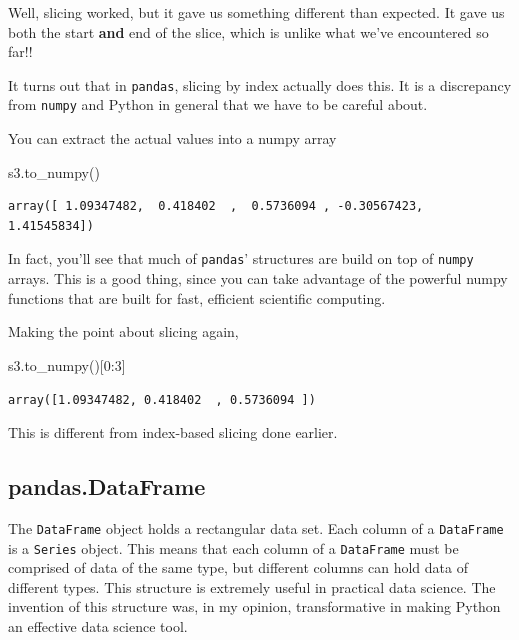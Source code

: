 \documentclass[
  letterpaper,
]{scrbook}
\newenvironment{Shaded}{\begin{snugshade}}{\end{snugshade}}
\newcommand{\DecValTok}[1]{\textcolor[rgb]{0.00,0.00,0.81}{#1}}
\newcommand{\NormalTok}[1]{#1}
\begin{document}
Well, slicing worked, but it gave us something different than expected. It gave us both the start \textbf{and} end of the slice, which is unlike what we've encountered so far!!

It turns out that in \texttt{pandas}, slicing by index actually does this. It is a discrepancy from \texttt{numpy} and Python in general that we have to be careful about.

You can extract the actual values into a numpy array

\begin{Shaded}
\begin{Highlighting}[]
\NormalTok{s3.to_numpy()}
\end{Highlighting}
\end{Shaded}

\begin{verbatim}
array([ 1.09347482,  0.418402  ,  0.5736094 , -0.30567423,  1.41545834])
\end{verbatim}

In fact, you'll see that much of \texttt{pandas}' structures are build on top of \texttt{numpy} arrays. This is a good thing, since you can take advantage of the powerful numpy functions that are built for fast, efficient scientific computing.

Making the point about slicing again,

\begin{Shaded}
\begin{Highlighting}[]
\NormalTok{s3.to_numpy()[}\DecValTok{0}\NormalTok{:}\DecValTok{3}\NormalTok{]}
\end{Highlighting}
\end{Shaded}

\begin{verbatim}
array([1.09347482, 0.418402  , 0.5736094 ])
\end{verbatim}

This is different from index-based slicing done earlier.

\hypertarget{pandas.dataframe}{%
\subsection{pandas.DataFrame}\label{pandas.dataframe}}

The \texttt{DataFrame} object holds a rectangular data set. Each column of a \texttt{DataFrame} is a \texttt{Series} object. This means that each column of a \texttt{DataFrame} must be comprised of data of the same type, but different columns can hold data of different types. This structure is extremely useful in practical data science. The invention of this structure was, in my opinion, transformative in making Python an effective data science tool.
\end{document}
